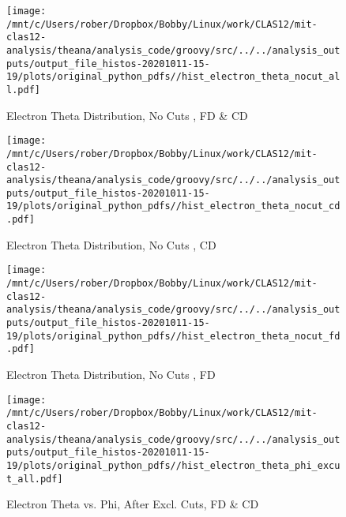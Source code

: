 \documentclass{article}
\begin{document}
\begin{landscape}
    \begin{figure}[h]
        \centering

        \texttt{[image: /mnt/c/Users/rober/Dropbox/Bobby/Linux/work/CLAS12/mit-clas12-analysis/theana/analysis\_code/groovy/src/../../analysis\_outputs/output\_file\_histos-20201011-15-19/plots/original\_python\_pdfs//hist\_electron\_theta\_nocut\_all.pdf]}
        \captionsetup{textformat=empty,labelformat=blank}
        \caption{Electron Theta Distribution, No Cuts , FD \& CD}
    \end{figure}
    \clearpage
    
    \begin{figure}[h]
        \centering

        \texttt{[image: /mnt/c/Users/rober/Dropbox/Bobby/Linux/work/CLAS12/mit-clas12-analysis/theana/analysis\_code/groovy/src/../../analysis\_outputs/output\_file\_histos-20201011-15-19/plots/original\_python\_pdfs//hist\_electron\_theta\_nocut\_cd.pdf]}
        \captionsetup{textformat=empty,labelformat=blank}
        \caption{Electron Theta Distribution, No Cuts , CD}
    \end{figure}
    \clearpage
    
    \begin{figure}[h]
        \centering

        \texttt{[image: /mnt/c/Users/rober/Dropbox/Bobby/Linux/work/CLAS12/mit-clas12-analysis/theana/analysis\_code/groovy/src/../../analysis\_outputs/output\_file\_histos-20201011-15-19/plots/original\_python\_pdfs//hist\_electron\_theta\_nocut\_fd.pdf]}
        \captionsetup{textformat=empty,labelformat=blank}
        \caption{Electron Theta Distribution, No Cuts , FD}
    \end{figure}
    \clearpage
    
    \begin{figure}[h]
        \centering

        \texttt{[image: /mnt/c/Users/rober/Dropbox/Bobby/Linux/work/CLAS12/mit-clas12-analysis/theana/analysis\_code/groovy/src/../../analysis\_outputs/output\_file\_histos-20201011-15-19/plots/original\_python\_pdfs//hist\_electron\_theta\_phi\_excut\_all.pdf]}
        \captionsetup{textformat=empty,labelformat=blank}
        \caption{Electron Theta vs. Phi, After Excl. Cuts, FD \& CD}
    \end{figure}
    \clearpage
    
    \begin{figure}[h]
        \centering


\end{figure}
\end{landscape}
\end{document}
